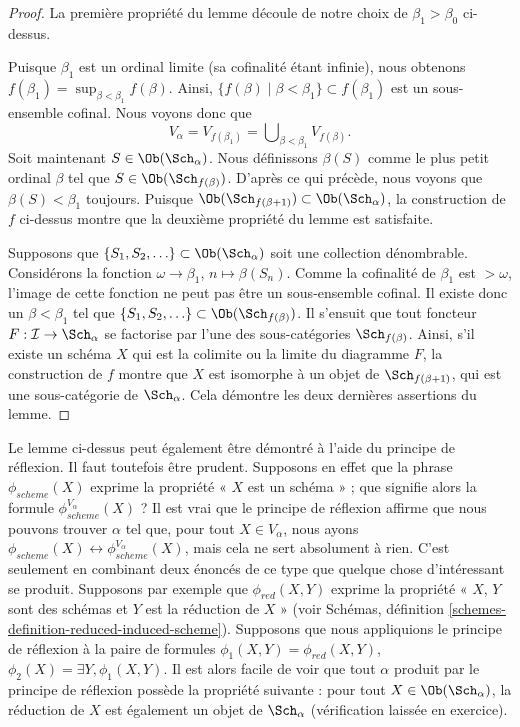 \begin{proof}
\medskip\noindent
La première propriété du lemme découle de notre choix de
$\beta_1 > \beta_0$ ci-dessus.

\medskip\noindent
Puisque $\beta_1$ est un ordinal limite (sa cofinalité étant infinie), nous
obtenons $f(\beta_1) = \sup_{\beta < \beta_1} f(\beta)$. Ainsi,
$\{f(\beta) \mid \beta < \beta_1\} \subset f(\beta_1)$ est un sous-ensemble
cofinal. Nous voyons donc que
$$
V_\alpha = V_{f(\beta_1)} = \bigcup\nolimits_{\beta < \beta_1} V_{f(\beta)}.
$$
Soit maintenant $S \in \Ob(\Sch_\alpha)$. Nous définissons $\beta(S)$ comme le
plus petit ordinal $\beta$ tel que
$S \in \Ob(\Sch_{f(\beta)})$. D'après ce qui précède, nous voyons que
$\beta(S) < \beta_1$ toujours. Puisque
$\Ob(\Sch_{f(\beta + 1)}) \subset
\Ob(\Sch_\alpha)$, la construction de $f$ ci-dessus montre que la deuxième
propriété du lemme est satisfaite.

\medskip\noindent
Supposons que $\{S_1, S_2, \ldots\} \subset \Ob(\Sch_\alpha)$ soit une
collection dénombrable. Considérons la fonction
$\omega \to \beta_1$, $n \mapsto \beta(S_n)$. Comme la cofinalité de $\beta_1$
est $> \omega$, l'image de cette fonction ne peut pas être un sous-ensemble
cofinal. Il existe donc un $\beta < \beta_1$ tel que
$\{S_1, S_2, \ldots\} \subset \Ob(\Sch_{f(\beta)})$. Il s'ensuit que tout
foncteur $F : \mathcal{I} \to \Sch_\alpha$ se factorise par l'une des
sous-catégories $\Sch_{f(\beta)}$. Ainsi, s'il existe un schéma $X$ qui est la
colimite ou la limite du diagramme $F$, la construction de $f$ montre que $X$
est isomorphe à un objet de $\Sch_{f(\beta + 1)}$, qui est une sous-catégorie
de $\Sch_\alpha$. Cela démontre les deux dernières assertions du lemme.
\end{proof}

\begin{remark}
\label{remark-how-to-use-reflection}
Le lemme ci-dessus peut également être démontré à l'aide du principe de
réflexion. Il faut toutefois être prudent. Supposons en effet que la phrase
$\phi_{scheme}(X)$ exprime la propriété « $X$ est un schéma » ; que signifie
alors la formule $\phi_{scheme}^{V_\alpha}(X)$ ? Il est vrai que le principe de
réflexion affirme que nous pouvons trouver $\alpha$ tel que, pour tout
$X \in V_\alpha$, nous ayons
$\phi_{scheme}(X) \leftrightarrow \phi_{scheme}^{V_\alpha}(X)$,
mais cela ne sert absolument à rien. C'est seulement en combinant deux énoncés
de ce type que quelque chose d'intéressant se produit. Supposons par exemple
que $\phi_{red}(X, Y)$ exprime la propriété « $X$, $Y$ sont des schémas et $Y$
est la réduction de $X$ » (voir Schémas, définition
\ref{schemes-definition-reduced-induced-scheme}). Supposons que nous appliquions
le principe de réflexion à la paire de formules
$\phi_1(X, Y) = \phi_{red}(X, Y)$,
$\phi_2(X) = \exists Y, \phi_1(X, Y)$. Il est alors facile de voir que tout
$\alpha$ produit par le principe de réflexion possède la propriété suivante :
pour tout $X \in \Ob(\Sch_\alpha)$, la réduction de $X$ est également un objet
de $\Sch_\alpha$ (vérification laissée en exercice).
\end{remark}

